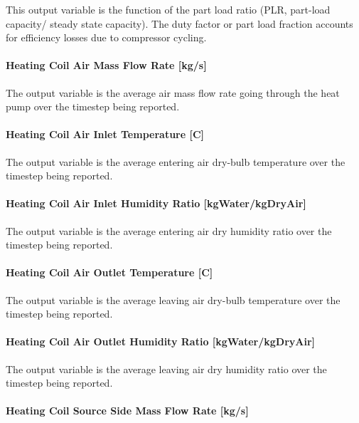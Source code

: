 This output variable is the function of the part load ratio (PLR, part-load capacity/ steady state capacity). The duty factor or part load fraction accounts for efficiency losses due to compressor cycling.

\paragraph{Heating Coil Air Mass Flow Rate {[}kg/s{]}}\label{heating-coil-air-mass-flow-rate-kgs-2}

The output variable is the average air mass flow rate going through the heat pump over the timestep being reported.

\paragraph{Heating Coil Air Inlet Temperature {[}C{]}}\label{heating-coil-air-inlet-temperature-c-2}

The output variable is the average entering air dry-bulb temperature over the timestep being reported.

\paragraph{Heating Coil Air Inlet Humidity Ratio {[}kgWater/kgDryAir{]}}\label{heating-coil-air-inlet-humidity-ratio-kgwaterkgdryair-2}

The output variable is the average entering air dry humidity ratio over the timestep being reported.

\paragraph{Heating Coil Air Outlet Temperature {[}C{]}}\label{heating-coil-air-outlet-temperature-c-2}

The output variable is the average leaving air dry-bulb temperature over the timestep being reported.

\paragraph{Heating Coil Air Outlet Humidity Ratio {[}kgWater/kgDryAir{]}}\label{heating-coil-air-outlet-humidity-ratio-kgwaterkgdryair-2}

The output variable is the average leaving air dry humidity ratio over the timestep being reported.

\paragraph{Heating Coil Source Side Mass Flow Rate {[}kg/s{]}}\label{heating-coil-source-side-mass-flow-rate-kgs-1}

